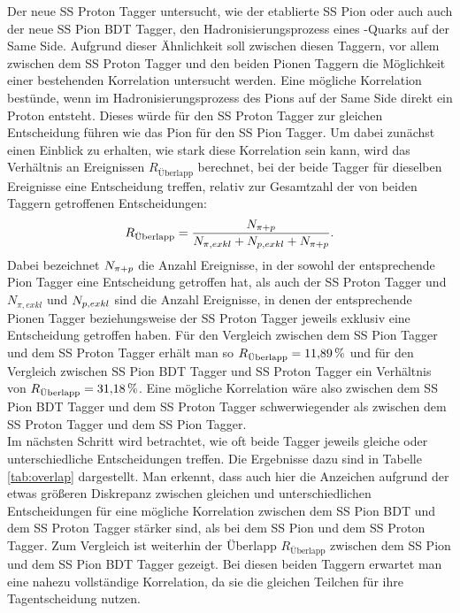 Der neue SS Proton Tagger untersucht, wie der etablierte SS Pion oder auch auch der neue SS Pion BDT Tagger, den Hadronisierungsprozess eines \dquark-Quarks auf der Same Side. Aufgrund dieser Ähnlichkeit soll zwischen diesen Taggern, vor allem zwischen dem SS Proton Tagger und den beiden Pionen Taggern die Möglichkeit einer bestehenden Korrelation untersucht werden. Eine mögliche Korrelation bestünde, wenn im Hadronisierungsprozess des Pions auf der Same Side direkt ein Proton entsteht. Dieses würde für den SS Proton Tagger zur gleichen Entscheidung führen wie das Pion für den SS Pion Tagger. Um dabei zunächst einen Einblick zu erhalten, wie stark diese Korrelation sein kann, wird das Verhältnis an Ereignissen $R_\text{Überlapp}$ berechnet, bei der beide Tagger für dieselben Ereignisse eine Entscheidung treffen, relativ zur Gesamtzahl der von beiden Taggern getroffenen Entscheidungen:
\begin{equation}
R_\text{Überlapp}=\frac{N_{\pi+{p}}}{N_{\pi,exkl}+N_{{p},exkl}+N_{\pi+{p}}}.
\end{equation}
Dabei bezeichnet $N_{\pi+{p}}$ die Anzahl Ereignisse, in der sowohl der entsprechende Pion Tagger eine Entscheidung getroffen hat, als auch der SS Proton Tagger und $N_{\pi,exkl}$ und $N_{{p},exkl}$ sind die Anzahl Ereignisse, in denen der entsprechende Pionen Tagger beziehungsweise der SS Proton Tagger jeweils exklusiv eine Entscheidung getroffen haben. Für den Vergleich zwischen dem SS Pion Tagger und dem SS Proton Tagger erhält man so $R_\text{Überlapp}=\SI{11{,}89}{\%}$ und für den Vergleich zwischen SS Pion BDT Tagger und SS Proton Tagger ein Verhältnis von $R_\text{Überlapp}=\SI{31{,}18}{\%}$. Eine mögliche Korrelation wäre also zwischen dem SS Pion BDT Tagger und dem SS Proton Tagger schwerwiegender als zwischen dem SS Proton Tagger und dem SS Pion Tagger.\\
Im nächsten Schritt wird betrachtet, wie oft beide Tagger jeweils gleiche  oder unterschiedliche Entscheidungen treffen. Die Ergebnisse dazu sind in Tabelle \ref{tab:overlap} dargestellt. Man erkennt, dass auch hier die Anzeichen aufgrund der etwas größeren Diskrepanz zwischen gleichen und unterschiedlichen Entscheidungen für eine mögliche Korrelation zwischen dem SS Pion BDT und dem SS Proton Tagger stärker sind, als bei dem SS Pion und dem SS Proton Tagger. Zum Vergleich ist weiterhin der Überlapp $R_\text{Überlapp}$ zwischen dem SS Pion und dem SS Pion BDT Tagger gezeigt. Bei diesen beiden Taggern erwartet man eine nahezu vollständige Korrelation, da sie die gleichen Teilchen für ihre Tagentscheidung nutzen.
